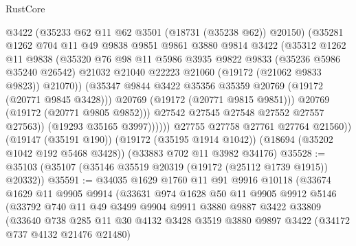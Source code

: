 \begin{lexlean}{RustCore}
\begin{coremodule}
                        @3422
                        (@35233 @62 @11 @62 @3501 (@18731 (@35238 @62)) @20150)
                        (@35281
                          @1262
                          @704
                          @11
                          @49
                          @9838
                          @9851
                          @9861
                          @3880
                          @9814
                          @3422
                          (@35312
                            @1262
                            @11
                            @9838
                            (@35320
                              @76
                              @98
                              @11
                              @5986
                              @3935
                              @9822
                              @9833
                              (@35236 @5986 @35240 @26542)
                              @21032
                              @21040
                              @22223
                              @21060
                              (@19172 (@21062 @9833 @9823))
                              @21070))
                          (@35347 @9844 @3422 @35356 @35359 @20769 (@19172 (@20771 @9845 @3428)))
                          @20769
                          (@19172 (@20771 @9815 @9851)))
                        @20769
                        (@19172 (@20771 @9805 @9852)))
                      @27542
                      @27545
                      @27548
                      @27552
                      @27557
                      @27563))
                  (@19293 @35165 @3997))))))
        @27755
        @27758
        @27761
        @27764
        @21560))
    (@19147 (@35191 @190))
    (@19172 (@35195 @1914 @1042))
    (@18694 (@35202 @1042 @192 @5468 @3428))
    (@33883 @702 @11 @3982 @34176)
@35528 := @35103 (@35107 (@35146 @35519 @20319 (@19172 (@25112 @1739 @1915)) @20332))
@35591 := @34035
    @1629
    @1760
    @11
    @91
    @9916
    @10118
    (@33674
      @1629
      @11
      @9905
      @9914
      (@33631
        @974
        @1628
        @50
        @11
        @9905
        @9912
        @5146
        (@33792
          @740
          @11
          @49
          @3499
          @9904
          @9911
          @3880
          @9887
          @3422
          @33809
          (@33640
            @738
            @285
            @11
            @30
            @4132
            @3428
            @3519
            @3880
            @9897
            @3422
            (@34172 @737 @4132 @21476 @21480)

\end{coremodule}
\end{lexlean}
